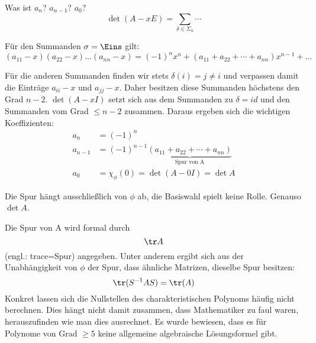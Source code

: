 \documentclass[a4paper, 10pt]{scrbook}
\begin{document}
Was ist $a_n$? $a_{n-1}$? $a_0$?
\fixme
\[
\det(A-xE)=\sum_{\delta \in \Sigma_n} \cdots
\]

Für den Summanden $\sigma=\Eins$ gilt:
 \[
 (a_{11}-x)(a_{22}-x)...(a_{nn}-x)=(-1)^nx^n+(a_{11}+a_{22}+\cdots+a_{nn})x^{n-1}+...
 \]

Für die anderen Summanden finden wir stets $\delta(i)=j\neq i$  und verpassen damit die Einträge $a_{ii}-x$ und $a_{jj}-x$.  Daher  besitzen diese Summanden höchstens den Grad $n-2$. $\det(A-xI)$ setzt sich aus dem Summanden zu $\delta=id$ und den Summanden vom Grad $\leq n-2$ zusammen.  Daraus ergeben sich die wichtigen Koeffizienten:
\begin{align*}
a_n&=(-1)^n \\
a_{n-1}&=(-1)^{n-1} \underbrace{(a_{11}+a_{22}+\cdots+a_{nn})}_{\text{Spur von A}} \\
a_0&=\chi_\phi(0)=\det(A-0I)=\det A
\end{align*}

\begin{note}
Die Spur hängt ausschließlich von $\phi$ ab, die Basiswahl spielt keine Rolle.
Genauso $\det A$.
\end{note}
\begin{note}
Die Spur von A wird formal durch 
\[
	\tr A
\]
(engl.: trace=Spur) angegeben. 
Unter anderem ergibt sich aus der Unabhängigkeit von $\phi$ der Spur, dass ähnliche Matrizen, dieselbe Spur besitzen:  
\[
	\tr (S^{-1}AS)= \tr (A)
\]
Konkret lassen sich die Nullstellen des charakteristischen Polynoms häufig nicht berechnen.  
Dies hängt nicht damit zusammen, dass Mathematiker zu faul waren, herauszufinden wie man dies ausrechnet. 
Es wurde bewiesen, dass es für Polynome von Grad $\ge 5$ keine allgemeine algebraische Lösungsformel gibt.
\end{note}
\end{document}

